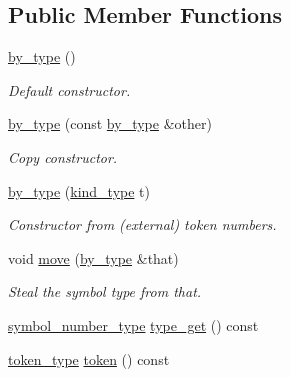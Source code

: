 \subsection*{Public Member Functions}
\begin{DoxyCompactItemize}
\item 
\hypertarget{structyy_1_1parser_1_1by__type_a16c7227367f85b611980ed547f545483}{}\hyperlink{structyy_1_1parser_1_1by__type_a16c7227367f85b611980ed547f545483}{by\+\_\+type} ()\label{structyy_1_1parser_1_1by__type_a16c7227367f85b611980ed547f545483}

\begin{DoxyCompactList}\small\item\em Default constructor. \end{DoxyCompactList}\item 
\hypertarget{structyy_1_1parser_1_1by__type_aa99c31c49c133c9ec3fe3f06ee30692c}{}\hyperlink{structyy_1_1parser_1_1by__type_aa99c31c49c133c9ec3fe3f06ee30692c}{by\+\_\+type} (const \hyperlink{structyy_1_1parser_1_1by__type}{by\+\_\+type} \&other)\label{structyy_1_1parser_1_1by__type_aa99c31c49c133c9ec3fe3f06ee30692c}

\begin{DoxyCompactList}\small\item\em Copy constructor. \end{DoxyCompactList}\item 
\hypertarget{structyy_1_1parser_1_1by__type_a7f43ae4d6b5ae70d2a7ef537c1ea42b2}{}\hyperlink{structyy_1_1parser_1_1by__type_a7f43ae4d6b5ae70d2a7ef537c1ea42b2}{by\+\_\+type} (\hyperlink{structyy_1_1parser_1_1by__type_af8757490fd5397ad574e9fee1b80fa25}{kind\+\_\+type} t)\label{structyy_1_1parser_1_1by__type_a7f43ae4d6b5ae70d2a7ef537c1ea42b2}

\begin{DoxyCompactList}\small\item\em Constructor from (external) token numbers. \end{DoxyCompactList}\item 
\hypertarget{structyy_1_1parser_1_1by__type_a68911dec3423e0748fd56f369d1b5d10}{}void \hyperlink{structyy_1_1parser_1_1by__type_a68911dec3423e0748fd56f369d1b5d10}{move} (\hyperlink{structyy_1_1parser_1_1by__type}{by\+\_\+type} \&that)\label{structyy_1_1parser_1_1by__type_a68911dec3423e0748fd56f369d1b5d10}

\begin{DoxyCompactList}\small\item\em Steal the symbol type from {\itshape that}. \end{DoxyCompactList}\item 
\hyperlink{classyy_1_1parser_a522f5c6c3481d9285b0b991ac12292eb}{symbol\+\_\+number\+\_\+type} \hyperlink{structyy_1_1parser_1_1by__type_a2324af0aef49d4a89ef346ebf5d66559}{type\+\_\+get} () const 
\item 
\hypertarget{structyy_1_1parser_1_1by__type_ab13b34d01faa03e8e5c24069aedaa225}{}\hyperlink{classyy_1_1parser_ac1ba3f834abfa251ea746c4ca8da5a85}{token\+\_\+type} \hyperlink{structyy_1_1parser_1_1by__type_ab13b34d01faa03e8e5c24069aedaa225}{token} () const \label{structyy_1_1parser_1_1by__type_ab13b34d01faa03e8e5c24069aedaa225}


\end{DoxyCompactItemize}
